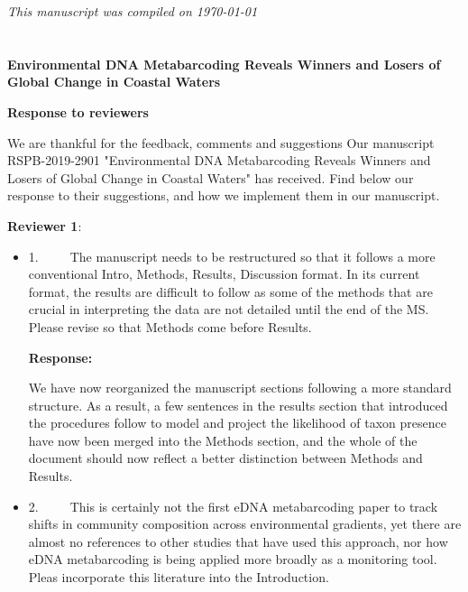 \documentclass[11pt]{article}
\begin{document}
\begin{linenumbers}
       
   
\textit{\tiny	This manuscript was compiled on \today }	
\section*{}

\textbf{ 
 Environmental DNA Metabarcoding Reveals Winners and Losers of Global Change in Coastal Waters} 
  
\textbf {Response to reviewers}


\vspace*{1em}

We are thankful for the feedback, comments and suggestions Our manuscript RSPB-2019-2901  "Environmental DNA Metabarcoding Reveals Winners and Losers of Global Change in Coastal Waters" has received. Find below our response to their suggestions, and how we implement them in our manuscript.

\vspace*{1em}
\textbf{\large{ Reviewer 1}}: 

\begin{itemize}

\item{1.      The manuscript needs to be restructured so that it follows a more conventional Intro, Methods, Results, Discussion format. In its current format, the results are difficult to follow as some of the methods that are crucial in interpreting the data are not detailed until the end of the MS. Please revise so that Methods come before Results. }

\textbf{Response:}

We have now reorganized the manuscript sections following a more standard structure. As a result, a few sentences in the results section that introduced the procedures follow to model and project the likelihood of taxon presence have now been merged into the Methods section, and the whole of the document should now reflect a better distinction between Methods and Results. 


\item{2.      This is certainly not the first eDNA metabarcoding paper to track shifts in community composition across environmental gradients, yet there are almost no references to other studies that have used this approach, nor how eDNA metabarcoding is being applied more broadly as a monitoring tool. Pleas incorporate this literature into the Introduction. }


\end{itemize}
\end{linenumbers}
\end{document}

